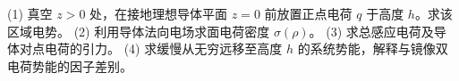 (1) 真空 \(z>0\) 处，在接地理想导体平面 \(z=0\) 前放置正点电荷 \(q\) 于高度 \(h\)。求该区域电势。
(2) 利用导体法向电场求面电荷密度 \(\sigma(\rho)\)。
(3) 求总感应电荷及导体对点电荷的引力。
(4) 求缓慢从无穷远移至高度 \(h\) 的系统势能，解释与镜像双电荷势能的因子差别。
